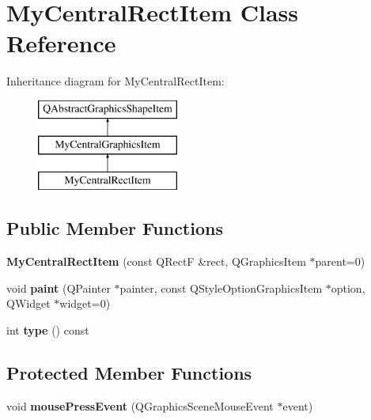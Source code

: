 \hypertarget{class_my_central_rect_item}{}\section{My\+Central\+Rect\+Item Class Reference}
\label{class_my_central_rect_item}
Inheritance diagram for My\+Central\+Rect\+Item\+:\begin{figure}[H]
\begin{center}
\leavevmode
\includegraphics[height=3.000000cm]{class_my_central_rect_item}
\end{center}
\end{figure}
\subsection*{Public Member Functions}
\begin{DoxyCompactItemize}
\item 
\hypertarget{class_my_central_rect_item_a7edf24741fb0098e78dea7079d2983f3}{}{\bfseries My\+Central\+Rect\+Item} (const Q\+Rect\+F \&rect, Q\+Graphics\+Item $\ast$parent=0)\label{class_my_central_rect_item_a7edf24741fb0098e78dea7079d2983f3}

\item 
\hypertarget{class_my_central_rect_item_a87c70071f69fb8fc4142af545447f326}{}void {\bfseries paint} (Q\+Painter $\ast$painter, const Q\+Style\+Option\+Graphics\+Item $\ast$option, Q\+Widget $\ast$widget=0)\label{class_my_central_rect_item_a87c70071f69fb8fc4142af545447f326}

\item 
\hypertarget{class_my_central_rect_item_a4b970e08db43fd6b8f18dce8114458c2}{}int {\bfseries type} () const \label{class_my_central_rect_item_a4b970e08db43fd6b8f18dce8114458c2}

\end{DoxyCompactItemize}
\subsection*{Protected Member Functions}
\begin{DoxyCompactItemize}
\item 
\hypertarget{class_my_central_rect_item_ac6ed556955ad6f3c2643311e3de22f7a}{}void {\bfseries mouse\+Press\+Event} (Q\+Graphics\+Scene\+Mouse\+Event $\ast$event)\label{class_my_central_rect_item_ac6ed556955ad6f3c2643311e3de22f7a}

\end{DoxyCompactItemize}
